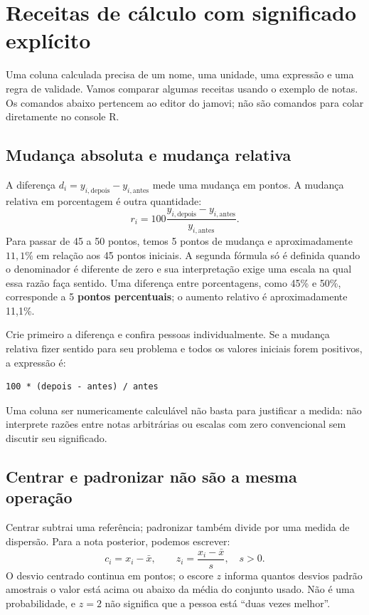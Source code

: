 \section{Receitas de cálculo com significado explícito}
\label{sec:receitas-calculos}

Uma coluna calculada precisa de um nome, uma unidade, uma expressão e uma regra de validade. Vamos comparar algumas receitas usando o exemplo de notas. Os comandos abaixo pertencem ao editor do jamovi; não são comandos para colar diretamente no console R.

\subsection{Mudança absoluta e mudança relativa}

A diferença $d_i=y_{i,\mathrm{depois}}-y_{i,\mathrm{antes}}$ mede uma mudança em pontos. A mudança relativa em porcentagem é outra quantidade:
\[
 r_i=100\frac{y_{i,\mathrm{depois}}-y_{i,\mathrm{antes}}}
 {y_{i,\mathrm{antes}}}.
\]
Para passar de 45 a 50 pontos, temos 5 pontos de mudança e aproximadamente $11{,}1\%$ em relação aos 45 pontos iniciais. A segunda fórmula só é definida quando o denominador é diferente de zero e sua interpretação exige uma escala na qual essa razão faça sentido. Uma diferença entre porcentagens, como 45\% e 50\%, corresponde a 5 \textbf{pontos percentuais}; o aumento relativo é aproximadamente 11,1\%.

Crie primeiro a diferença e confira pessoas individualmente. Se a mudança relativa fizer sentido para seu problema e todos os valores iniciais forem positivos, a expressão é:
\begin{verbatim}
100 * (depois - antes) / antes
\end{verbatim}
Uma coluna ser numericamente calculável não basta para justificar a medida: não interprete razões entre notas arbitrárias ou escalas com zero convencional sem discutir seu significado.

\subsection{Centrar e padronizar não são a mesma operação}

Centrar subtrai uma referência; padronizar também divide por uma medida de dispersão. Para a nota posterior, podemos escrever:
\[
 c_i=x_i-\bar x,
 \qquad z_i=\frac{x_i-\bar x}{s},\quad s>0.
\]
O desvio centrado continua em pontos; o escore $z$ informa quantos desvios padrão amostrais o valor está acima ou abaixo da média do conjunto usado. Não é uma probabilidade, e $z=2$ não significa que a pessoa está ``duas vezes melhor''.

